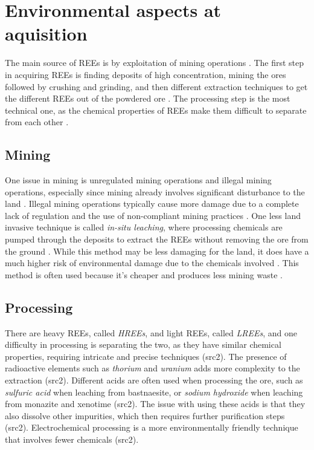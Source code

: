 
\section{Environmental aspects at aquisition}

The main source of REEs is by exploitation of mining operations \cite{REELandscape}. The first step in acquiring REEs is finding deposits of high concentration, mining the ores followed by crushing and grinding, and then different extraction techniques to get the different REEs out of the powdered ore \cite{REELandscape}. The processing step is the most technical one, as the chemical properties of REEs make them difficult to separate from each other \cite{britannica2024}.


\subsection{Mining}

One issue in mining is unregulated mining operations and illegal mining operations, especially since mining already involves significant disturbance to the land \cite{unregulatedMining}. Illegal mining operations typically cause more damage due to a complete lack of regulation and the use of non-compliant mining practices \cite{unregulatedMining}. One less land invasive technique is called \textit{in-situ leaching}, where processing chemicals are pumped through the deposits to extract the REEs without removing the ore from the ground \cite{REELandscape}. While this method may be less damaging for the land, it does have a much higher risk of environmental damage due to the chemicals involved \cite{unregulatedMining}. This method is often used because it's cheaper and produces less mining waste \cite{unregulatedMining}.

\subsection{Processing}

There are heavy REEs, called \textit{HREEs}, and light REEs, called \textit{LREEs}, and one difficulty in processing is separating the two, as they have similar chemical properties, requiring intricate and precise techniques (src2). The presence of radioactive elements such as \textit{thorium} and \textit{uranium} adds more complexity to the extraction (src2). Different acids are often used when processing the ore, such as \textit{sulfuric acid} when leaching from bastnaesite, or \textit{sodium hydroxide} when leaching from monazite and xenotime (src2). The issue with using these acids is that they also dissolve other impurities, which then requires further purification steps (src2). Electrochemical processing is a more environmentally friendly technique that involves fewer chemicals (src2).

